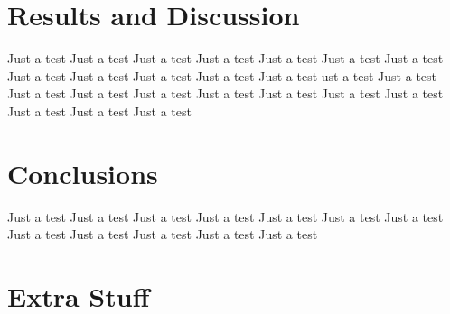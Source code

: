 \documentclass[draft]{IIBproject}
\begin{document}
\section{Results and Discussion}
Just a test Just a test Just a test Just a test Just a test Just a test 
Just a test Just a test Just a test Just a test Just a test Just a test 
ust a test Just a test Just a test Just a test Just a test Just a test 
Just a test Just a test Just a test Just a test Just a test Just a test 

\section{Conclusions}
Just a test Just a test Just a test Just a test Just a test Just a test 
Just a test Just a test Just a test Just a test Just a test Just a test 

%

\appendix

\section{Extra Stuff}
\end{document}
